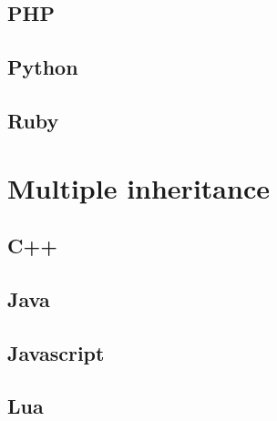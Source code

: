 \documentclass{KodeBook}
\begin{document}
\subsection{PHP}


\subsection{Python}


\subsection{Ruby}




\section{Multiple inheritance}

\subsection{C++}


\subsection{Java}


\subsection{Javascript} 


\subsection{Lua}
\end{document}
